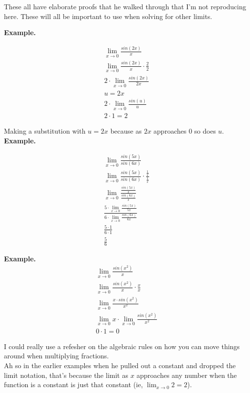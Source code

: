 \documentclass{article}
\begin{document}
These all have elaborate proofs that he walked through that I'm not reproducing here. These will all be important to use when solving for other limits.

\textbf{Example.}

\begin{align*}
    \lim_{x\to 0} \frac{sin(2x)}{x}\\
    \lim_{x\to 0} \frac{sin(2x)}{x} \cdot \frac{2}{2}\\
    2 \cdot \lim_{x\to 0} \frac{sin(2x)}{2x} \\ 
    u = 2x \\
    2 \cdot \lim_{x\to 0} \frac{sin(u)}{u}\\
    2 \cdot 1 = 2
\end{align*}

Making a substitution with $u = 2x$ because as $2x$ approaches $0$ so does $u$.\\

\textbf{Example.}

\begin{align*}
    \lim_{x\to 0} \frac{sin(5x)}{sin(6x)}\\
    \lim_{x\to 0} \frac{sin(5x)}{sin(6x)} \cdot \frac{\frac{1}{x}}{\frac{1}{x}}\\
    \lim_{x\to 0} \frac{\frac{sin(5x)}{x}}{\frac{sin(6x)}{x}}\\
    \frac{5 \cdot \lim_{x\to 0} \frac{sin(5x)}{5x}}{6 \cdot \lim_{x\to 0}
    \frac{sin(6x)}{6x}}\\
    \frac{5 \cdot 1}{6 \cdot 1}\\
    \frac{5}{6}
\end{align*}


\textbf{Example.}\\

\begin{align*}
    \lim_{x\to 0} \frac{sin(x^2)}{x}\\
    \lim_{x\to 0} \frac{sin(x^2)}{x} \cdot \frac{x}{x}\\
    \lim_{x\to 0} \frac{x \cdot sin(x^2)}{x^2}\\
    \lim_{x\to 0} x \cdot \lim_{x\to 0} \frac{sin(x^2)}{x^2}\\
    0 \cdot 1 = 0
\end{align*}

I could really use a refesher on the algebraic rules on how you can move things around
when multiplying fractions.\\

Ah so in the earlier examples when he pulled out a constant and dropped the limit
notation, that's because the limit as $x$ approaches any number when the function is a
constant is just that constant (ie, $\lim_{x\to 0} 2 = 2$).\\
\end{document}
